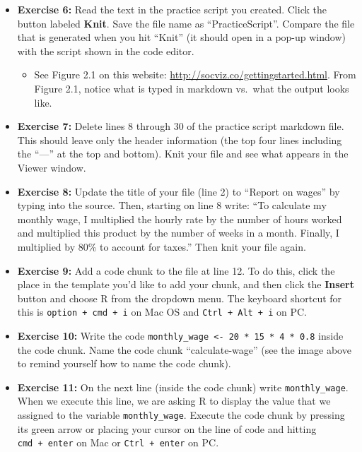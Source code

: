 \documentclass[
]{article}
\providecommand{\tightlist}{%
  \setlength{\itemsep}{0pt}\setlength{\parskip}{0pt}}
\begin{document}
\begin{itemize}
\tightlist
\item
  \textbf{Exercise 6:} Read the text in the practice script you created.
  Click the button labeled \textbf{Knit}. Save the file name as
  ``PracticeScript''. Compare the file that is generated when you hit
  ``Knit'' (it should open in a pop-up window) with the script shown in
  the code editor.

  \begin{itemize}
  \tightlist
  \item
    See Figure 2.1 on this website:
    \url{http://socviz.co/gettingstarted.html}. From Figure 2.1, notice
    what is typed in markdown vs.~what the output looks like.
  \end{itemize}
\item
  \textbf{Exercise 7:} Delete lines 8 through 30 of the practice script
  markdown file. This should leave only the header information (the top
  four lines including the ``---'' at the top and bottom). Knit your
  file and see what appears in the Viewer window.
\item
  \textbf{Exercise 8:} Update the title of your file (line 2) to
  ``Report on wages'' by typing into the source. Then, starting on line
  8 write: ``To calculate my monthly wage, I multiplied the hourly rate
  by the number of hours worked and multiplied this product by the
  number of weeks in a month. Finally, I multiplied by 80\% to account
  for taxes.'' Then knit your file again.
\item
  \textbf{Exercise 9:} Add a code chunk to the file at line 12. To do
  this, click the place in the template you'd like to add your chunk,
  and then click the \textbf{Insert} button and choose R from the
  dropdown menu. The keyboard shortcut for this is
  \texttt{option\ +\ cmd\ +\ i} on Mac OS and
  \texttt{Ctrl\ +\ Alt\ +\ i} on PC.
\item
  \textbf{Exercise 10:} Write the code
  \texttt{monthly\_wage\ \textless{}-\ 20\ *\ 15\ *\ 4\ *\ 0.8} inside
  the code chunk. Name the code chunk ``calculate-wage'' (see the image
  above to remind yourself how to name the code chunk).
\item
  \textbf{Exercise 11:} On the next line (inside the code chunk) write
  \texttt{monthly\_wage}. When we execute this line, we are asking R to
  display the value that we assigned to the variable
  \texttt{monthly\_wage}. Execute the code chunk by pressing its green
  arrow or placing your cursor on the line of code and hitting
  \texttt{cmd\ +\ enter} on Mac or \texttt{Ctrl\ +\ enter} on PC.
\end{itemize}
\end{document}
